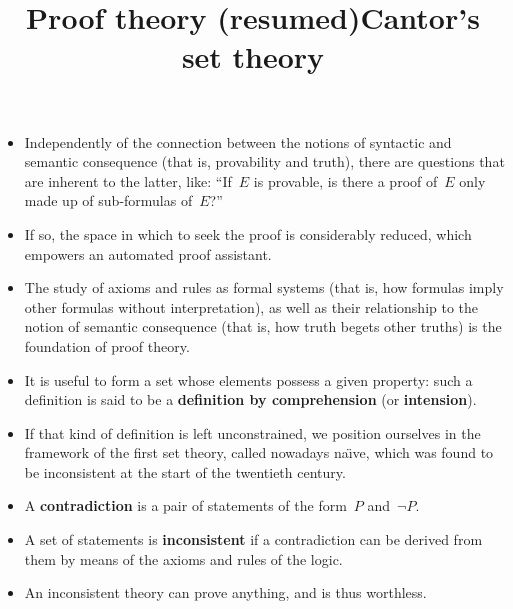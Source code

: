 \documentclass[wide]{slides}
\begin{document}
\begin{slide}
  \title{Proof theory (resumed)}

  \begin{itemize}

    \item Independently of the connection between the notions of
      syntactic and semantic consequence (that is, provability and
      truth), there are questions that are inherent to the latter,
      like: ``If~$E$ is provable, is there a proof of~$E$ only made up
      of sub-formulas of~$E$?''

    \item If so, the space in which to seek the proof is considerably
      reduced, which empowers an automated proof assistant.

    \item The study of axioms and rules as formal systems (that is,
      how formulas imply other formulas without interpretation), as
      well as their relationship to the notion of semantic consequence
      (that is, how truth begets other truths) is the foundation of
      proof theory.

  \end{itemize}

\end{slide}

\begin{slide}
  \title{Cantor's set theory}

  \begin{itemize}

    \item It is useful to form a set whose elements possess a given
      property: such a definition is said to be a \textbf{definition
        by comprehension} (or \textbf{intension}).

    \item If that kind of definition is left unconstrained, we
      position ourselves in the framework of the first set theory,
      called nowadays na\"{\i}ve, which was found to be inconsistent
      at the start of the twentieth century.

    \item A \textbf{contradiction} is a pair of statements of the
      form~$P$ and~$\neg P$.

    \item A set of statements is \textbf{inconsistent} if a
      contradiction can be derived from them by means of the axioms
      and rules of the logic.

    \item An inconsistent theory can prove anything, and is thus
      worthless.

  \end{itemize}

\end{slide}
\end{document}
